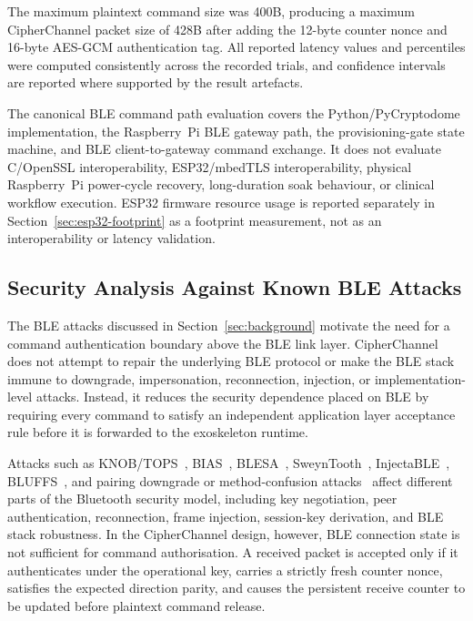 \documentclass[journal]{IEEEtran}
\begin{document}
The maximum plaintext command size was 400B, producing a maximum CipherChannel packet size of 428B after adding the 12-byte counter nonce and 16-byte AES-GCM authentication tag. All reported latency values and percentiles were computed consistently across the recorded trials, and confidence intervals are reported where supported by the result artefacts.

The canonical BLE command path evaluation covers the Python/PyCryptodome implementation, the Raspberry~Pi BLE gateway path, the provisioning-gate state machine, and BLE client-to-gateway command exchange. It does not evaluate C/OpenSSL interoperability, ESP32/mbedTLS interoperability, physical Raspberry~Pi power-cycle recovery, long-duration soak behaviour, or clinical workflow execution. ESP32 firmware resource usage is reported separately in Section~\ref{sec:esp32-footprint} as a footprint measurement, not as an interoperability or latency validation.

\subsection{Security Analysis Against Known BLE Attacks}
\label{sec:attackcoverage}

The BLE attacks discussed in Section~\ref{sec:background} motivate the need for a command authentication boundary above the BLE link layer. CipherChannel does not attempt to repair the underlying BLE protocol or make the BLE stack immune to downgrade, impersonation, reconnection, injection, or implementation-level attacks. Instead, it reduces the security dependence placed on BLE by requiring every command to satisfy an independent application layer acceptance rule before it is forwarded to the exoskeleton runtime.

Attacks such as KNOB/TOPS~\cite{antonioli2020knob,zhang2020downgrade}, BIAS~\cite{antonioli2020bias}, BLESA~\cite{wu2020blesa}, SweynTooth~\cite{garbelini2020sweyntooth}, InjectaBLE~\cite{cayre2021injectable}, BLUFFS~\cite{antonioli2023bluffs}, and pairing downgrade or method-confusion attacks~\cite{tschirschnitz2021method} affect different parts of the Bluetooth security model, including key negotiation, peer authentication, reconnection, frame injection, session-key derivation, and BLE stack robustness. In the CipherChannel design, however, BLE connection state is not sufficient for command authorisation. A received packet is accepted only if it authenticates under the operational key, carries a strictly fresh counter nonce, satisfies the expected direction parity, and causes the persistent receive counter to be updated before plaintext command release.
\end{document}
